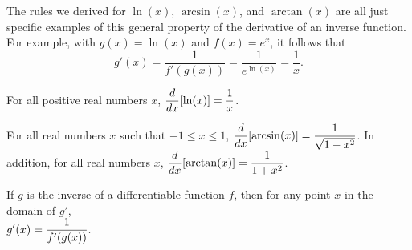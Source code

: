 The rules we derived for $\ln(x)$, $\arcsin(x)$, and $\arctan(x)$ are all just specific examples of this general property of the derivative of an inverse function.  For example, with $g(x) = \ln(x)$ and $f(x) = e^x$, it follows that
$$g'(x) = \frac{1}{f'(g(x))} = \frac{1}{e^{\ln(x)}} = \frac{1}{x}.$$

\begin{summary}
\item For all positive real numbers $x$, $\displaystyle \frac{d}{dx}[\ln(x)] = \frac{1}{x}$.
\item For all real numbers $x$ such that $-1 \le x \le 1$, $\displaystyle \frac{d}{dx}[\arcsin(x)] = \frac{1}{\sqrt{1-x^2}}$.  In addition, for all real numbers $x$, $\displaystyle \frac{d}{dx}[\arctan(x)] = \frac{1}{1+x^2}$.
\item If $g$ is the inverse of a differentiable function $f$, then for any point $x$ in the domain of $g'$, \\ $\displaystyle g'(x) = \frac{1}{f'(g(x))}.$
\end{summary}

\nin \hrulefill

 

\clearpage
